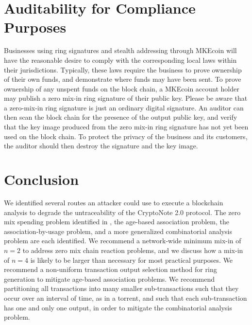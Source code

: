 \documentclass[12pt,english]{mrl}
\theoremstyle{definition}
\numberwithin{equation}{section}
\numberwithin{figure}{section}
\numberwithin{equation}{section}
\numberwithin{equation}{section}
\numberwithin{figure}{section}
\begin{document}
\begin{comment}
\EndFor

\State \Return $Result$

\end{algorithmic}
\end{algorithm}

Different variants of the above algorithm can be used by defining an expected age of a transaction based on it's denomination. Intuitively, it's more likely that a user hoards a very large transaction output with, say, a denomination around $100,000$ XMR, rather than a small transaction output with, say, a denomination around $0.1$ XMR.

\end{comment}


\section{Auditability for Compliance Purposes}\label{auditability}

Businesses using ring signatures and stealth addressing through MKEcoin will have the reasonable desire to comply with the corresponding local laws within their jurisdictions. Typically, these laws require the business to prove ownership of their own funds, and demonstrate where funds may have been sent. To prove ownership of any unspent funds on the block chain, a MKEcoin account holder may publish a zero mix-in ring signature of their public key. Please be aware that a zero-mix-in ring signature is just an ordinary digital signature. An auditor can then scan the block chain for the presence of the output public key, and verify that the key image produced from the zero mix-in ring signature has not yet been used on the block chain. To protect the privacy of the business and its customers, the auditor should then destroy the signature and the key image.

\section{Conclusion}\label{conclusion}

We identified several routes an attacker could use to execute a blockchain analysis to degrade the untraceability of the CryptoNote 2.0 protocol. The zero mix spending problem identified in \cite{chainReactions}, the age-based association problem, the association-by-usage problem, and a more generalized combinatorial analysis problem are each identified. We recommend a network-wide minimum mix-in of $n=2$ to address zero mix chain reaction problems, and we discuss how a mix-in of $n=4$ is likely to be larger than necessary for most practical purposes. We recommend a non-uniform transaction output selection method for ring generation to mitigate age-based association problems. We recommend partitioning all transactions into many smaller sub-transactions such that they occur over an interval of time, as in a torrent, and such that each sub-transaction has one and only one output, in order to mitigate the combinatorial analysis problem.





\medskip{}



\end{document}

